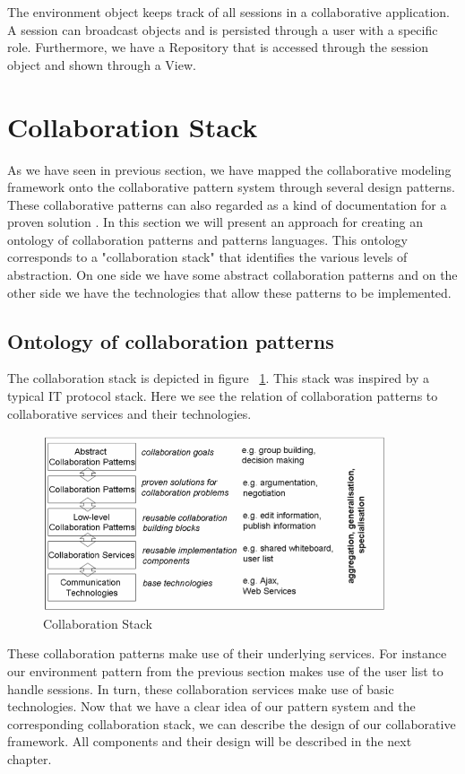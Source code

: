 The environment object keeps track of all sessions in a collaborative application. A session can broadcast objects and is persisted through a user with a specific role. Furthermore, we have a Repository that is accessed through the session object and shown through a View.

\section{Collaboration Stack}

As we have seen in previous section, we have mapped the collaborative modeling framework onto the collaborative pattern system through several design patterns. These collaborative patterns can also regarded as a kind of documentation for a proven solution \cite{CollOntology}. In this section we will present an approach for creating an ontology of collaboration patterns and patterns languages. This ontology corresponds to a "collaboration stack" that identifies the various levels of abstraction. On one side we have some abstract collaboration patterns and on the other side we have the technologies that allow these patterns to be implemented.

\subsection{Ontology of collaboration patterns}

The collaboration stack is depicted in figure ~\ref{fig:coll_stack}. This stack was inspired by a typical IT protocol stack. Here we see the relation of collaboration patterns to collaborative services and their technologies. 

\begin{figure}[h!]
\centering
\includegraphics[width=0.9\textwidth]{images/chap5_coll_stack.png}
\caption{Collaboration Stack}
\label{fig:coll_stack}
\end{figure}

These collaboration patterns make use of their underlying services. For instance our environment pattern from the previous section makes use of the user list to handle sessions. In turn, these collaboration services make use of basic technologies. Now that we have a clear idea of our pattern system and the corresponding collaboration stack, we can describe the design of our collaborative framework. All components and their design will be described in the next chapter.
